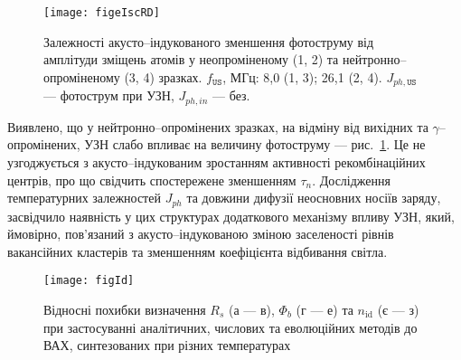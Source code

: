 \begin{figure}[ht]
\center
\texttt{[image: figeIscRD]}
\caption{\label{figeIscRD}
Залежності акусто--індукованого зменшення фотоструму від
амплітуди зміщень атомів у неопроміненому (1, 2)
та нейтронно--опроміненому (3, 4) зразках.
$f_\mathtt{US}$, МГц: 8,0 (1, 3);
26,1 (2, 4).
$J_{ph,\mathtt{US}}$ --- фотострум при УЗН,
$J_{ph,in}$ --- без.
}%
\end{figure}

Виявлено, що у нейтронно--опромінених зразках, на відміну від вихідних та  $\gamma$--опромінених, УЗН слабо впливає на величину фотоструму --- рис.~\ref{figeIscRD}.
Це не узгоджується з акусто--індукованим зростанням активності рекомбінаційних центрів, про що свідчить спостережене зменшенням $\tau_n$.
Дослідження температурних залежностей $J_{ph}$ та довжини дифузії неосновних носіїв заряду,
засвідчило наявність у цих структурах додаткового механізму впливу УЗН, який, ймовірно, пов'язаний з акусто--індукованою зміною заселеності рівнів вакансійних кластерів та зменшенням коефіцієнта відбивання світла.


\begin{figure}
\center
\texttt{[image: figId]}%
\caption{\label{figId}
Відносні похибки визначення $R_s$ (а --- в), $\Phi_b$ (г --- е) та $n_\mathrm{id}$ (є --- з)
при застосуванні аналітичних, числових та еволюційних методів до ВАХ, синтезованих при різних температурах
}
\end{figure}

